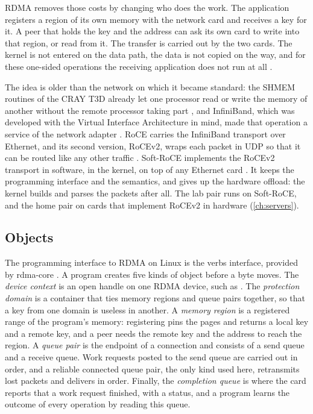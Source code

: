 RDMA removes those costs by changing who does the work. The application
registers a region of its own memory with the network card and receives a key
for it. A peer that holds the key and the address can ask its own card to
write into that region, or read from it. The transfer is carried out by the
two cards. The kernel is not entered on the data path, the data is not copied
on the way, and for these one-sided operations the receiving application does
not run at all \citep{snia2025rdma,mellanox_ibwp}.

The idea is older than the network on which it became standard: the SHMEM
routines of the CRAY T3D already let one processor read or write the memory
of another without the remote processor taking part
\citep{feind1995shmem}, and InfiniBand, which was developed with the Virtual
Interface Architecture in mind, made that operation a service of the network
adapter \citep{mellanox_ibwp}. RoCE carries the
InfiniBand transport over Ethernet, and its second version, RoCEv2, wraps each
packet in UDP so that it can be routed like any other traffic
\citep{zhu2015dcqcn}. Soft-RoCE implements the RoCEv2 transport in software,
in the kernel, on top of any Ethernet card \citep{ibta_softroce2015}. It keeps
the programming interface and the semantics, and gives up the hardware
offload: the kernel builds and parses the packets after all. The lab pair runs on Soft-RoCE, and the home pair on cards that implement
RoCEv2 in hardware (\cref{ch:servers}).

\subsection{Objects}

The programming interface to RDMA on Linux is the verbs interface, provided
by rdma-core \citep{rdmacore}. A program creates five kinds of object before
a byte moves. The \emph{device context} is an open handle on one RDMA device, such as
. The \emph{protection domain} is a container that ties memory
regions and queue pairs together, so that a key from one domain is useless in
another. A \emph{memory region} is a registered range of the program's
memory: registering pins the pages and returns a local key and a remote key,
and a peer needs the remote key and the address to reach the region. A
\emph{queue pair} is the endpoint of a connection and consists of a send
queue and a receive queue. Work requests posted to the send queue are carried
out in order, and a reliable connected queue pair, the only kind used here,
retransmits lost packets and delivers in order. Finally, the
\emph{completion queue} is where the card reports that a work request
finished, with a status, and a program learns the outcome of every operation
by reading this queue.

